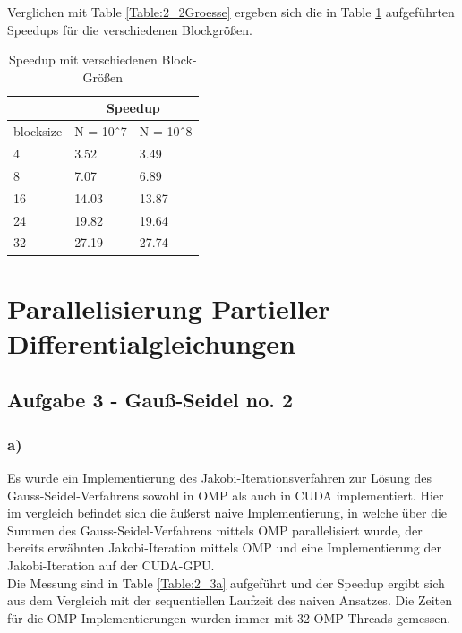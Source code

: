 \documentclass{report}
\begin{document}
Verglichen mit Table \ref{Table:2_2Groesse} ergeben sich die in Table \ref{Table:2_2Speedup} aufgeführten Speedups für die verschiedenen Blockgrößen. 
\begin{table}
	\centering
	\begin{tabular}{l|l|l|}
		\cline{2-3}
		& \multicolumn{2}{c|}{Speedup} \\ \hline
		\multicolumn{1}{|l|}{blocksize} & N = 10ˆ7      & N = 10ˆ8     \\ \hline
		\multicolumn{1}{|l|}{4}         & 3.52          & 3.49         \\ \hline
		\multicolumn{1}{|l|}{8}         & 7.07          &       6.89       \\ \hline
		\multicolumn{1}{|l|}{16}        & 14.03         &       13.87       \\ \hline
		\multicolumn{1}{|l|}{24}        & 19.82         &     19.64         \\ \hline
		\multicolumn{1}{|l|}{32}        & 27.19         & 27.74        \\ \hline
	\end{tabular}
	\caption{Speedup mit verschiedenen Block-Größen}
	\label{Table:2_2Speedup}
\end{table}
\section{Parallelisierung Partieller Differentialgleichungen}
\subsection{Aufgabe 3 - Gauß-Seidel no. 2}

\subsubsection{a)}

Es wurde ein Implementierung des Jakobi-Iterationsverfahren zur Lösung des Gauss-Seidel-Verfahrens sowohl in OMP als auch in CUDA implementiert.
Hier im vergleich befindet sich die äußerst naive Implementierung, in welche über die Summen des Gauss-Seidel-Verfahrens mittels OMP parallelisiert wurde,
der bereits erwähnten Jakobi-Iteration mittels OMP und eine Implementierung der Jakobi-Iteration auf der CUDA-GPU.\\
Die Messung sind in Table \ref{Table:2_3a} aufgeführt und der Speedup ergibt sich aus dem Vergleich mit der sequentiellen Laufzeit des naiven Ansatzes.
Die Zeiten für die OMP-Implementierungen wurden immer mit 32-OMP-Threads gemessen.
\end{document}
